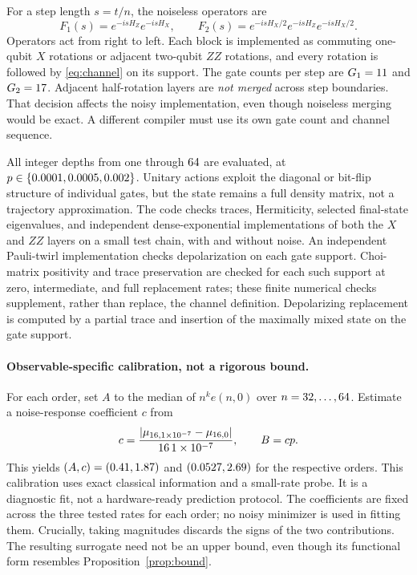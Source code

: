 \documentclass{article}
\DeclarePairedDelimiter{\abs}{\lvert}{\rvert}
\begin{document}
For a step length $s=t/n$, the noiseless operators are
\[
 F_{1}(s)=e^{-isH_Z}e^{-isH_X},\qquad
 F_{2}(s)=e^{-isH_X/2}e^{-isH_Z}e^{-isH_X/2}.
\]
Operators act from right to left. Each block is implemented as commuting one-qubit $X$ rotations or adjacent two-qubit $ZZ$ rotations, and every rotation is followed by \eqref{eq:channel} on its support. The gate counts per step are $G_{1}=11$ and $G_{2}=17$. Adjacent half-rotation layers are \emph{not merged} across step boundaries. That decision affects the noisy implementation, even though noiseless merging would be exact. A different compiler must use its own gate count and channel sequence.

All integer depths from one through $64$ are evaluated, at $p\in\{0.0001,0.0005,0.002\}$. Unitary actions exploit the diagonal or bit-flip structure of individual gates, but the state remains a full density matrix, not a trajectory approximation. The code checks traces, Hermiticity, selected final-state eigenvalues, and independent dense-exponential implementations of both the $X$ and $ZZ$ layers on a small test chain, with and without noise. An independent Pauli-twirl implementation checks depolarization on each gate support. Choi-matrix positivity and trace preservation are checked for each such support at zero, intermediate, and full replacement rates; these finite numerical checks supplement, rather than replace, the channel definition. Depolarizing replacement is computed by a partial trace and insertion of the maximally mixed state on the gate support.

\paragraph{Observable-specific calibration, not a rigorous bound.}
For each order, set $A$ to the median of $n^k e(n,0)$ over $n=32,\ldots,64$. Estimate a noise-response coefficient $c$ from
\[
 c=\frac{\abs{\mu_{\Ncal,\Pcal}-\mu_{\Ncal,0}}}{\Ncal\,\Pcal},\qquad B=cp.
\]
This yields $(A,c)=(0.41,1.87)$ and $(0.0527,2.69)$ for the respective orders. This calibration uses exact classical information and a small-rate probe. It is a diagnostic fit, not a hardware-ready prediction protocol. The coefficients are fixed across the three tested rates for each order; no noisy minimizer is used in fitting them. Crucially, taking magnitudes discards the signs of the two contributions. The resulting surrogate need not be an upper bound, even though its functional form resembles Proposition~\ref{prop:bound}.
\end{document}
